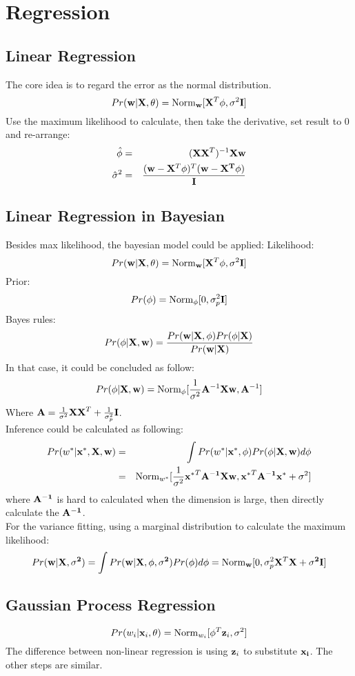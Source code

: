 \documentclass[12pt,a4paper]{article}
\begin{document}
\section*{Regression}
\subsection*{Linear Regression}
The core idea is to regard the error as the normal distribution.
$$
Pr({\bf w}|{\bf X,\theta}) = {\rm Norm}_{\bf w}[{\bf X}^T\phi,\sigma^2{\bf I}]
$$
Use the maximum likelihood to calculate, then take the derivative, set result to 0 and re-arrange:
\begin{eqnarray*}
\hat \phi &=& ({\bf XX}^T)^{-1}{\bf X}{\bf w}\\
\hat \sigma^2 &=& \frac{({\bf w}-{\bf X}^T\phi)^T({\bf w-{\bf X}^T\phi})}{\bf I}
\end{eqnarray*}
\subsection*{Linear Regression in Bayesian}
Besides max likelihood, the bayesian model could be applied:
Likelihood:
$$
Pr({\bf w}|{\bf X,\theta}) = {\rm Norm}_{\bf w}[{\bf X}^T\phi,\sigma^2{\bf I}]
$$
Prior:
$$
Pr(\phi) = {\rm Norm}_\phi[0,\sigma_p^2{\bf I}]
$$
Bayes rules:
$$
Pr(\phi|{\bf X,w}) = \frac{Pr({\bf w|X,\phi})Pr(\phi|{\bf X})}{Pr({\bf w|X})}
$$
In that case, it could be concluded as follow:
$$
Pr(\phi|{\bf X,w}) ={\rm Norm}_{\phi}[\frac{1}{\sigma^2}{\bf A}^{-1}{\bf Xw},{\bf A}^{-1}] 
$$
Where ${\bf A}=\frac{1}{\sigma^2}{\bf XX}^T+\frac{1}{\sigma_p^2}{\bf I}$.\\
Inference could be calculated as following:
\begin{eqnarray*}
Pr(w^*|{\bf x}^*,{\bf X,w}) &=& \int Pr(w^*|{\bf x}^*,\phi)Pr(\phi|{\bf X,w})d\phi\\
 &=& {\rm Norm}_{w^*}[\frac{1}{\sigma^2}{{\bf x}^*}^T{\bf A^{-1}Xw},{\bf x^*}^T{\bf A^{-1}x^*}+\sigma^2]
\end{eqnarray*}
where $\bf A^{-1}$ is hard to calculated when the dimension is large, then directly calculate the $\bf A^{-1}$.\\
For the variance fitting, using a marginal distribution to calculate the maximum likelihood:
$$
Pr({\bf w|X,\sigma^2}) = \int Pr({\bf w|X,\phi,\sigma^2})Pr(\phi)d\phi = {\rm Norm}_{\bf w}[0,\sigma_p^2{\bf X}^T{\bf X+\sigma^2I}]
$$
\subsection*{Gaussian Process Regression}
$$
Pr(w_i|{\bf x}_i,\theta) = {\rm Norm}_{w_i}[\phi^T{\bf z}_i,\sigma^2]
$$
The difference between non-linear regression is using ${\bf z}_i$ to substitute $\bf x_i$. The other steps are similar.
\end{document}
